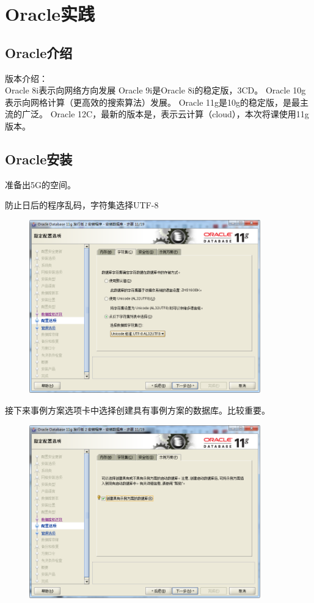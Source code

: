 \chapter{Oracle实践}

\section{Oracle介绍}
版本介绍：\\
Oracle 8i表示向网络方向发展
Oracle 9i是Oracle 8i的稳定版，3CD。
Oracle 10g表示向网格计算（更高效的搜索算法）发展。
Oracle 11g是10g的稳定版，是最主流的广泛。
Oracle 12C，最新的版本是，表示云计算（cloud），本次将课使用11g版本。

\section{Oracle安装}
准备出5G的空间。

防止日后的程序乱码，字符集选择UTF-8
\begin{figure}[H]
  \centering
  \includegraphics[width=10cm]{oracle/安装步骤_指定配置_选择字符集.png}
\end{figure}
接下来事例方案选项卡中选择创建具有事例方案的数据库。比较重要。
\begin{figure}[H]
  \centering
  \includegraphics[width=10cm]{oracle/安装步骤_指定配置_选择创建示例方案.png}
\end{figure}

